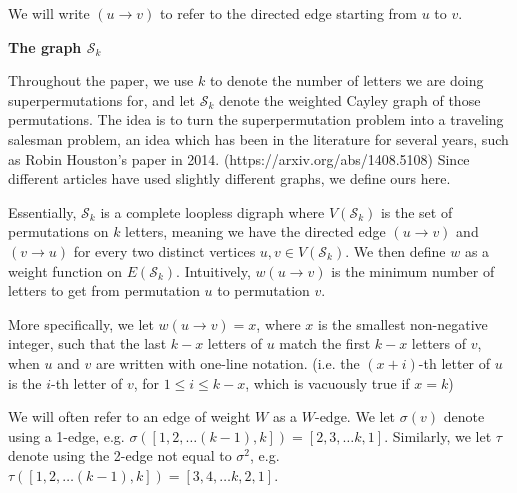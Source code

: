 \documentclass{article}
\newcommand{\hide}[1]{}
\begin{document}
We will write $(u\to v)$ to refer to the directed edge starting from $u$ to $v$.

\vspace{1.75em}

\textbf{The graph $\mathcal{S}_k$} 

Throughout the paper, we use $k$ to denote the number of letters we are doing superpermutations for, and let $\mathcal{S}_k$ denote the weighted Cayley graph of those permutations. The idea is to turn the superpermutation problem into a traveling salesman problem, an idea which has been in the literature for several years, such as Robin Houston's paper in 2014. (https://arxiv.org/abs/1408.5108) \hide{@misc{houston2014tackling,
    title={Tackling the Minimal Superpermutation Problem},
    author={Robin Houston},
    year={2014},
    eprint={1408.5108},
    archivePrefix={arXiv},
    primaryClass={math.CO}
}} Since different articles have used slightly different graphs, we define ours here.

Essentially, $\mathcal{S}_k$ is a complete loopless digraph where $V(\mathcal{S}_k)$ is the set of permutations on $k$ letters, meaning we have the directed edge $(u \to v)$ and $(v \to u)$ for every two distinct vertices $u,v \in V(\mathcal{S}_k)$. We then define $w$ as a weight function on $E(\mathcal{S}_k)$. Intuitively, $w(u\to v)$ is the minimum number of letters to get from permutation $u$ to permutation $v$. 
 
 More specifically, we let $w(u\to v) = x$, where $x$ is the smallest non-negative integer, such that the last $k-x$ letters of $u$ match the first $k-x$ letters of $v$, when $u$ and $v$ are written with one-line notation. (i.e. the $(x+i)$-th letter of $u$ is the $i$-th letter of $v$, for $1\le i \le k-x $, which is vacuously true if $x = k$)
 
 \hide{Specifically, we will define $\mathcal{S}_k$ through the $k$-dimensional De Bruijn graph on $k$ letters, $G_k$. We define $A_k = \{1,2\dots k\}$ which is intuitively our alphabet. We have that $V(G_k) = A_k^k$, and that for each vertex, $v = [a_1, a_2\dots a_k]$, we have the directed edges $(v \to [a_2, a_3 \dots a_k,b])$, for each $b \in A_k$. We then create a weight $w'$, where $w'(u \to v)$ is the length of the shortest directed path from $u$ to $v$ in $G_k$. We then have that $\mathcal{S}_k$ is a directed weighted graph where $V(\mathcal{S}_k)$ is the set of permutations of $A_k$, with $w(u \to v) = w'(u \to v)$ for each $u,v \in V(\mathcal{S}_k)$.}

We will often refer to an edge of weight $W$ as a $W$-edge. We let $\sigma(v)$ denote using a 1-edge, e.g. $\sigma([1,2,\dots (k-1), k]) = [2,3,\dots k,1]$. Similarly, we let $\tau$ denote using the 2-edge not equal to $\sigma^2$, e.g. $\tau([1,2,\dots (k-1), k]) = [3,4,\dots k,2,1]$.
\end{document}
